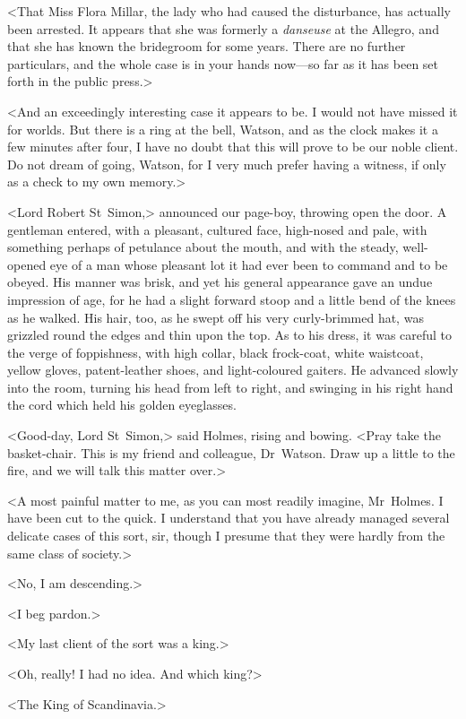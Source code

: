 <That Miss Flora Millar, the lady who had caused the disturbance, has actually been arrested. It appears that she was formerly a \textit{danseuse} at the Allegro, and that she has known the bridegroom for some years. There are no further particulars, and the whole case is in your hands now—so far as it has been set forth in the public press.>

<And an exceedingly interesting case it appears to be. I would not have missed it for worlds. But there is a ring at the bell, Watson, and as the clock makes it a few minutes after four, I have no doubt that this will prove to be our noble client. Do not dream of going, Watson, for I very much prefer having a witness, if only as a check to my own memory.>

<Lord Robert St~Simon,> announced our page-boy, throwing open the door. A gentleman entered, with a pleasant, cultured face, high-nosed and pale, with something perhaps of petulance about the mouth, and with the steady, well-opened eye of a man whose pleasant lot it had ever been to command and to be obeyed. His manner was brisk, and yet his general appearance gave an undue impression of age, for he had a slight forward stoop and a little bend of the knees as he walked. His hair, too, as he swept off his very curly-brimmed hat, was grizzled round the edges and thin upon the top. As to his dress, it was careful to the verge of foppishness, with high collar, black frock-coat, white waistcoat, yellow gloves, patent-leather shoes, and light-coloured gaiters. He advanced slowly into the room, turning his head from left to right, and swinging in his right hand the cord which held his golden eyeglasses.

<Good-day, Lord St~Simon,> said Holmes, rising and bowing. <Pray take the basket-chair. This is my friend and colleague, Dr~Watson. Draw up a little to the fire, and we will talk this matter over.>

<A most painful matter to me, as you can most readily imagine, Mr~Holmes. I have been cut to the quick. I understand that you have already managed several delicate cases of this sort, sir, though I presume that they were hardly from the same class of society.>

<No, I am descending.>

<I beg pardon.>

<My last client of the sort was a king.>

<Oh, really! I had no idea. And which king?>

<The King of Scandinavia.>

